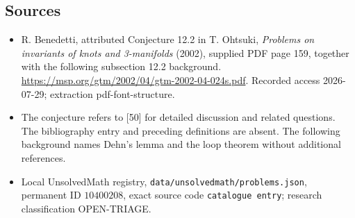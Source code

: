\documentclass[11pt]{article}
\begin{document}
\subsection{Sources}
\begin{itemize}
\item R. Benedetti, attributed Conjecture 12.2 in T. Ohtsuki, \emph{Problems on invariants of knots and 3-manifolds} (2002), supplied PDF page 159, together with the following subsection 12.2 background. \url{https://msp.org/gtm/2002/04/gtm-2002-04-024s.pdf}. Recorded access 2026-07-29; extraction pdf-font-structure.
\item The conjecture refers to [50] for detailed discussion and related questions. The bibliography entry and preceding definitions are absent. The following background names Dehn's lemma and the loop theorem without additional references.
\item Local UnsolvedMath registry, \texttt{data/unsolvedmath/problems.json}, permanent ID \(10400208\), exact source code \texttt{catalogue entry}; research classification OPEN-TRIAGE.
\end{itemize}
\end{document}
